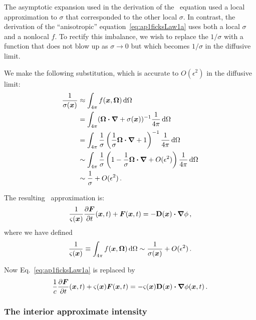 The asymptotic expansion used in the derivation of the \Pone\ equation used a
local approximation to $\sigma$ that corresponded to the other local $\sigma$.
In contrast, the derivation of the ``anisotropic''
equation~\eqref{eq:ap1ficksLaw1a} uses both a local $\sigma$ and a nonlocal $f$.
To rectify this imbalance, we wish to replace the $1/\sigma$ with a function
that does not blow up as $\sigma\to 0$ but which becomes $1/\sigma$ in the
diffusive limit.

We make the following substitution, which is accurate to $O(\epsilon^2)$ in the
diffusive limit:
\begin{align*}
  \frac{1}{\sigma(\bm{x})}
  &\approx \int_{4\pi} f(\bm{x},\bm{\Omega}) \mathop{}\!\mathrm{d} \Omega
  \\
  &= \int_{4\pi} (\bm{\Omega} \bm{\cdot} \bm{\nabla} + \sigma(\bm{x}) )^{-1}
  \frac{1}{4\pi} \mathop{}\!\mathrm{d} \Omega
  \\
  &= \int_{4\pi} \frac{1}{\sigma} \left( \frac{1}{\sigma} \bm{\Omega} \bm{\cdot}
  \bm{\nabla} + 1 \right)^{-1} \frac{1}{4\pi} \mathop{}\!\mathrm{d} \Omega
  \\
  &\sim \int_{4\pi} \frac{1}{\sigma} \left(1 - \frac{1}{\sigma} \bm{\Omega} \bm{\cdot}
  \bm{\nabla} + O(\epsilon^2) \right) \frac{1}{4\pi} \mathop{}\!\mathrm{d} \Omega
  \\
  &\sim \frac{1}{\sigma} + O(\epsilon^2) \,.
\end{align*}

The resulting \APone\ approximation is:
\begin{equation*}
  \frac{1}{\varsigma(\bm{x})} \frac{\partial \bm{F}}{\partial t}(\bm{x},t)
  + \bm{F}(\bm{x},t) = - \mathbf{D}(\bm{x}) \bm{\cdot} \bm{\nabla} \phi \,,
\end{equation*}
where we have defined
\begin{equation}\label{eq:varSigma}
  \frac{1}{\varsigma(\bm{x})}
  \equiv \int_{4\pi} f(\bm{x},\bm{\Omega}) \mathop{}\!\mathrm{d} \Omega
  \sim \frac{1}{\sigma(\bm{x})} + O(\epsilon^2)\,.
\end{equation}

Now Eq.~\eqref{eq:ap1ficksLaw1a} is replaced by
\begin{equation}\label{eq:ap1ficksLawFinal}
  \frac{1}{c}\frac{\partial \bm{F}}{\partial t}(\bm{x},t) + \varsigma(\bm{x})\bm{F}(\bm{x},t) 
  = - \varsigma(\bm{x}) \mathbf{D}(\bm{x}) \bm{\cdot} \bm{\nabla} \phi(\bm{x}, t) \,.
\end{equation}

\subsubsection{The interior approximate intensity}

